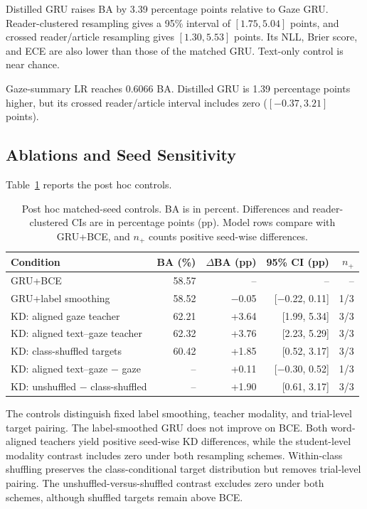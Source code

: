 \documentclass[conference,letterpaper]{IEEEtran}
\newcommand{\modelLinear}{Gaze-summary LR}
\newcommand{\modelGru}{Gaze GRU}
\newcommand{\modelText}{Text-only control}
\newcommand{\modelDistill}{Distilled GRU}
\begin{document}
\modelDistill{} raises BA by 3.39 percentage points relative to \modelGru{}.
Reader-clustered resampling gives a 95\% interval of $[1.75, 5.04]$ points, and
crossed reader/article resampling gives $[1.30, 5.53]$ points.  Its NLL, Brier
score, and ECE are also lower than those of the matched GRU.  \modelText{} is
near chance.

\modelLinear{} reaches 0.6066 BA.  \modelDistill{} is 1.39 percentage points
higher, but its crossed reader/article interval includes zero
($[-0.37, 3.21]$ points).

\subsection{Ablations and Seed Sensitivity}

Table~\ref{tab:controls} reports the post hoc controls.

\begin{table}[h]
\caption{Post hoc matched-seed controls.  BA is in percent.  Differences and
reader-clustered CIs are in percentage points (pp).  Model rows compare with
GRU+BCE, and $n_+$ counts positive seed-wise differences.}
\label{tab:controls}
\centering
\scriptsize
\setlength{\tabcolsep}{1.7pt}
\begin{tabular}{@{}lrrrr@{}}
\toprule
Condition & BA (\%) & $\Delta$BA (pp) & 95\% CI (pp) & $n_+$ \\
\midrule
GRU+BCE & 58.57 & -- & -- & -- \\
GRU+label smoothing & 58.52 & $-$0.05 & [$-$0.22, 0.11] & 1/3 \\
KD: aligned gaze teacher & 62.21 & +3.64 & [1.99, 5.34] & 3/3 \\
KD: aligned text--gaze teacher & 62.32 & +3.76 & [2.23, 5.29] & 3/3 \\
KD: class-shuffled targets & 60.42 & +1.85 & [0.52, 3.17] & 3/3 \\
\midrule
KD: aligned text--gaze $-$ gaze & -- & +0.11 & [$-$0.30, 0.52] & 1/3 \\
KD: unshuffled $-$ class-shuffled & -- & +1.90 & [0.61, 3.17] & 3/3 \\
\bottomrule
\end{tabular}
\end{table}

The controls distinguish fixed label smoothing, teacher modality, and
trial-level target pairing.  The label-smoothed GRU does not improve on BCE.
Both word-aligned teachers yield positive seed-wise KD differences, while the
student-level modality contrast includes zero under both resampling schemes.
Within-class shuffling preserves the class-conditional target distribution but
removes trial-level pairing.  The unshuffled-versus-shuffled contrast excludes
zero under both schemes, although shuffled targets remain above BCE.
\end{document}
